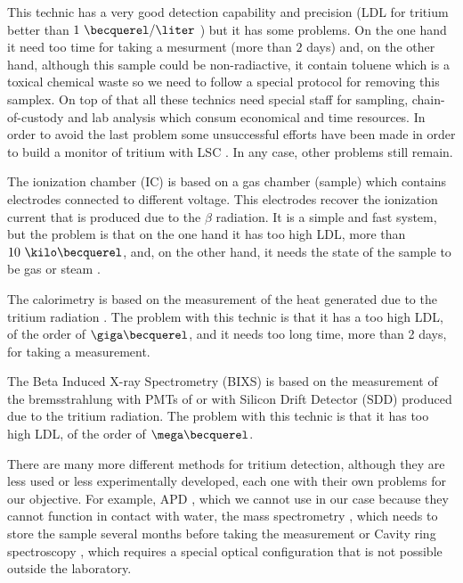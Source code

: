 This technic has a very good detection capability and precision (LDL for tritium better than $1~\becquerel/\liter$ \cite{0.6Bq_L}) but it has some problems. On the one hand it need too time for taking a mesurment (more than $2$ days) and, on the other hand, although this sample could be non-radiactive, it contain toluene which is a toxical chemical waste so we need to follow a special protocol for removing this samplex. On top of that all these technics need special staff for sampling, chain-of-custody and lab analysis which consum economical and time resources. In order to avoid the last problem some unsuccessful efforts have been made in order to build a monitor of tritium with LSC \cite{OnlineLSC}. In any case, other problems still remain. 

The ionization chamber (IC) is based on a gas chamber (sample) which contains electrodes connected to different voltage. This electrodes recover the ionization current that is produced due to the $\beta$ radiation. It is a simple and fast system, but the problem is that on the one hand it has too high LDL, more than $ 10~\kilo\becquerel$, and, on the other hand, it needs the state of the sample to be gas or steam \cite{IonizationChamber1} \cite{IonizationChamber2}.

The calorimetry is based on the measurement of the heat generated due to the tritium radiation \cite{Calorimeter1} \cite{Calorimeter2}. The problem with this technic is that it has a too high LDL, of the order of $\giga\becquerel$, and it needs too long time, more than 2 days, for taking a measurement.

The Beta Induced X-ray Spectrometry (BIXS) is based on the measurement of the bremsstrahlung with PMTs of  \cite{XRays1} \cite{XRays2} or with Silicon Drift Detector (SDD) \cite{Bremstrahlung} produced due to the tritium radiation. The problem with this technic is that it has too high LDL, of the order of $\mega\becquerel$.

There are many more different methods for tritium detection, although they are less used or less experimentally developed, each one with their own problems for our objective. For example,  APD \cite{APD}, which we cannot use in our case because they cannot function in contact with water, the mass spectrometry \cite{Spectrometry}, which needs to store the sample several months before taking the measurement or Cavity ring spectroscopy \cite{Ring}, which requires a special optical configuration that is not possible outside the laboratory.


